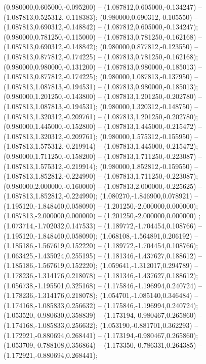  (0.980000,0.605000,-0.095200) -- (1.087812,0.605000,-0.134247) -- (1.087813,0.525312,-0.118383);
 (0.980000,0.690312,-0.105550) -- (1.087813,0.690312,-0.148842) -- (1.087812,0.605000,-0.134247);
 (0.980000,0.781250,-0.115000) -- (1.087813,0.781250,-0.162168) -- (1.087813,0.690312,-0.148842);
 (0.980000,0.877812,-0.123550) -- (1.087813,0.877812,-0.174225) -- (1.087813,0.781250,-0.162168);
 (0.980000,0.980000,-0.131200) -- (1.087813,0.980000,-0.185013) -- (1.087813,0.877812,-0.174225);
 (0.980000,1.087813,-0.137950) -- (1.087813,1.087813,-0.194531) -- (1.087813,0.980000,-0.185013);
 (0.980000,1.201250,-0.143800) -- (1.087813,1.201250,-0.202780) -- (1.087813,1.087813,-0.194531);
 (0.980000,1.320312,-0.148750) -- (1.087813,1.320312,-0.209761) -- (1.087813,1.201250,-0.202780);
 (0.980000,1.445000,-0.152800) -- (1.087813,1.445000,-0.215472) -- (1.087813,1.320312,-0.209761);
 (0.980000,1.575312,-0.155950) -- (1.087813,1.575312,-0.219914) -- (1.087813,1.445000,-0.215472);
 (0.980000,1.711250,-0.158200) -- (1.087813,1.711250,-0.223087) -- (1.087813,1.575312,-0.219914);
 (0.980000,1.852812,-0.159550) -- (1.087813,1.852812,-0.224990) -- (1.087813,1.711250,-0.223087);
 (0.980000,2.000000,-0.160000) -- (1.087813,2.000000,-0.225625) -- (1.087813,1.852812,-0.224990);
 (1.080270,-1.846900,0.078921) -- (1.195120,-1.848460,0.058090) -- (1.201250,-2.000000,0.000000);
 (1.087813,-2.000000,0.000000) -- (1.201250,-2.000000,0.000000) ;
 (1.073714,-1.702032,0.147533) -- (1.189772,-1.704454,0.108766) -- (1.195120,-1.848460,0.058090);
 (1.068108,-1.564891,0.206192) -- (1.185186,-1.567619,0.152220) -- (1.189772,-1.704454,0.108766);
 (1.063425,-1.435024,0.255195) -- (1.181346,-1.437627,0.188612) -- (1.185186,-1.567619,0.152220);
 (1.059641,-1.312017,0.294789) -- (1.178236,-1.314176,0.218078) -- (1.181346,-1.437627,0.188612);
 (1.056738,-1.195501,0.325168) -- (1.175846,-1.196994,0.240724) -- (1.178236,-1.314176,0.218078);
 (1.054701,-1.085140,0.346484) -- (1.174168,-1.085833,0.256632) -- (1.175846,-1.196994,0.240724);
 (1.053520,-0.980630,0.358839) -- (1.173194,-0.980467,0.265860) -- (1.174168,-1.085833,0.256632);
 (1.053190,-0.881701,0.362293) -- (1.172921,-0.880694,0.268441) -- (1.173194,-0.980467,0.265860);
 (1.053709,-0.788108,0.356864) -- (1.173350,-0.786331,0.264385) -- (1.172921,-0.880694,0.268441);
